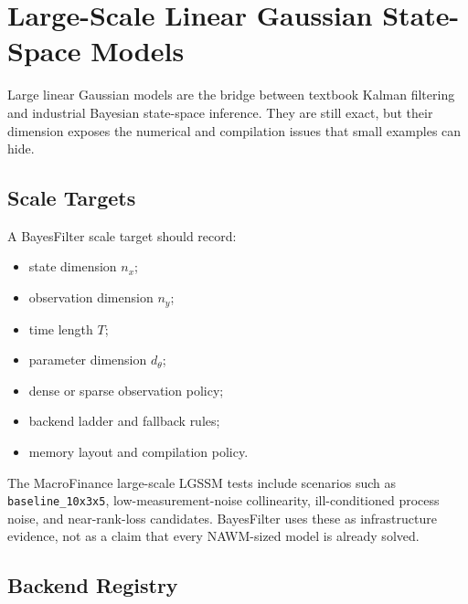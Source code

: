 \chapter{Large-Scale Linear Gaussian State-Space Models}
\label{ch:bf-large-scale-lgssm}

Large linear Gaussian models are the bridge between textbook Kalman filtering
and industrial Bayesian state-space inference.  They are still exact, but their
dimension exposes the numerical and compilation issues that small examples can
hide.

\section{Scale Targets}
\label{sec:bf-lgssm-scale-targets}

A BayesFilter scale target should record:
\begin{itemize}
  \item state dimension $n_x$;
  \item observation dimension $n_y$;
  \item time length $T$;
  \item parameter dimension $d_\theta$;
  \item dense or sparse observation policy;
  \item backend ladder and fallback rules;
  \item memory layout and compilation policy.
\end{itemize}
The MacroFinance large-scale LGSSM tests include scenarios such as
\texttt{baseline\_10x3x5}, low-measurement-noise collinearity,
ill-conditioned process noise, and near-rank-loss candidates.  BayesFilter
uses these as infrastructure evidence, not as a claim that every NAWM-sized
model is already solved.

\section{Backend Registry}
\label{sec:bf-lgssm-backend-registry}


